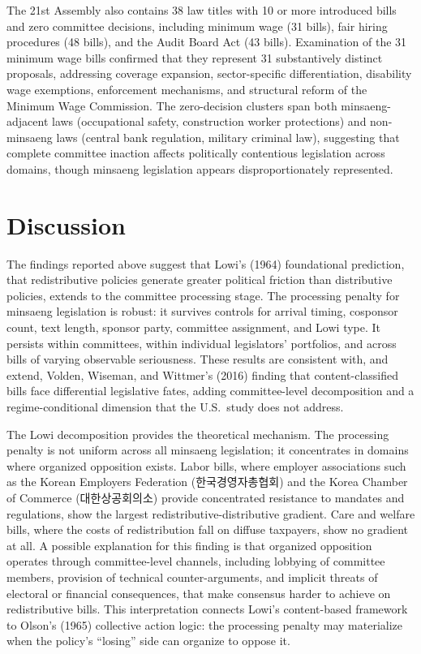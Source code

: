 \documentclass[11pt]{article}
\begin{document}
The 21st Assembly also contains 38 law titles with 10 or more introduced bills and zero committee decisions, including minimum wage (31 bills), fair hiring procedures (48 bills), and the Audit Board Act (43 bills). Examination of the 31 minimum wage bills confirmed that they represent 31 substantively distinct proposals, addressing coverage expansion, sector-specific differentiation, disability wage exemptions, enforcement mechanisms, and structural reform of the Minimum Wage Commission. The zero-decision clusters span both minsaeng-adjacent laws (occupational safety, construction worker protections) and non-minsaeng laws (central bank regulation, military criminal law), suggesting that complete committee inaction affects politically contentious legislation across domains, though minsaeng legislation appears disproportionately represented.


\section{Discussion}\label{sec:discussion}

The findings reported above suggest that Lowi's (1964) foundational prediction, that redistributive policies generate greater political friction than distributive policies, extends to the committee processing stage. The processing penalty for minsaeng legislation is robust: it survives controls for arrival timing, cosponsor count, text length, sponsor party, committee assignment, and Lowi type. It persists within committees, within individual legislators' portfolios, and across bills of varying observable seriousness. These results are consistent with, and extend, Volden, Wiseman, and Wittmer's (2016) finding that content-classified bills face differential legislative fates, adding committee-level decomposition and a regime-conditional dimension that the U.S.\ study does not address.

The Lowi decomposition provides the theoretical mechanism. The processing penalty is not uniform across all minsaeng legislation; it concentrates in domains where organized opposition exists. Labor bills, where employer associations such as the Korean Employers Federation (한국경영자총협회) and the Korea Chamber of Commerce (대한상공회의소) provide concentrated resistance to mandates and regulations, show the largest redistributive-distributive gradient. Care and welfare bills, where the costs of redistribution fall on diffuse taxpayers, show no gradient at all. A possible explanation for this finding is that organized opposition operates through committee-level channels, including lobbying of committee members, provision of technical counter-arguments, and implicit threats of electoral or financial consequences, that make consensus harder to achieve on redistributive bills. This interpretation connects Lowi's content-based framework to Olson's (1965) collective action logic: the processing penalty may materialize when the policy's ``losing'' side can organize to oppose it.
\end{document}
